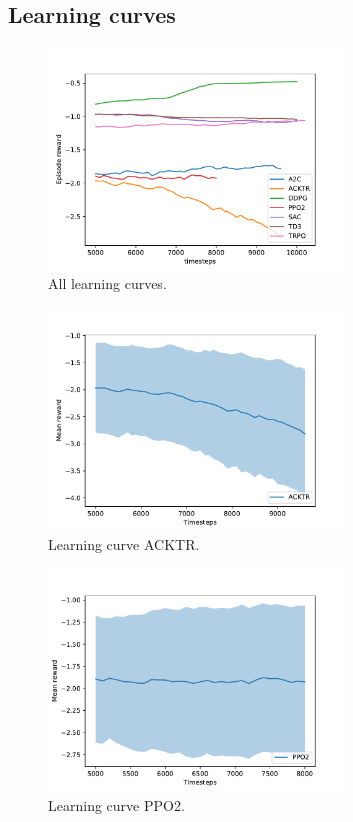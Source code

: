 \documentclass{article}
\begin{document}
\subsection{Learning curves}


\begin{figure}[H]
    \centering
    \includegraphics[width=0.7\textwidth]{../learning_curves.pdf}
\caption{All learning curves.}
\end{figure}



\begin{figure}[H]
    \centering
    \includegraphics[width=0.7\textwidth]{../ACKTR.pdf}
\caption{Learning curve ACKTR.}
\end{figure}


\begin{figure}[H]
    \centering
    \includegraphics[width=0.7\textwidth]{../PPO2.pdf}
\caption{Learning curve PPO2.}
\end{figure}
\end{document}
